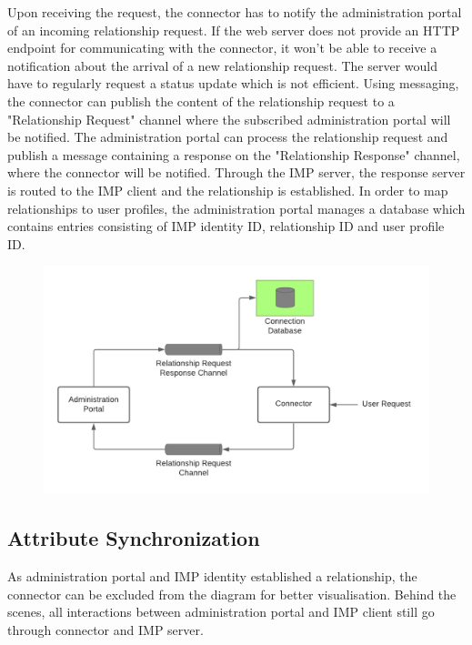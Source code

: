 Upon receiving the request, the connector has to notify the administration portal of an incoming relationship request. If the web server does not provide an HTTP endpoint for communicating with the connector, it won't be able to receive a notification about the arrival of a new relationship request. The server would have to regularly request a status update which is not efficient. Using messaging, the connector can publish the content of the relationship request to a "Relationship Request" channel where the subscribed administration portal will be notified. The administration portal can process the relationship request and publish a message containing a response on the "Relationship Response" channel, where the connector will be notified. Through the IMP server, the response server is routed to the IMP client and the relationship is established.
In order to map relationships to user profiles, the administration portal manages a database which contains entries consisting of IMP identity ID, relationship ID and user profile ID.

\begin{figure}[h]
    \centering
    \includegraphics[scale=0.3]{Diagrams/Integration Architecture 1/Overview/Relationship Request.png}
\end{figure}

\subsection{Attribute Synchronization}

As administration portal and IMP identity established a relationship, the connector can be excluded from the diagram for better visualisation. Behind the scenes, all interactions between administration portal and IMP client still go through connector and IMP server.

